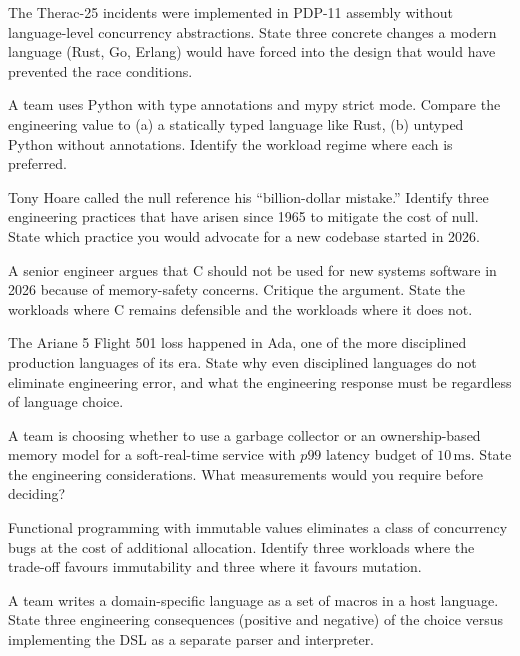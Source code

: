 \begin{exercise}
The Therac-25 incidents \cite{paper:leveson-turner1993} were implemented in PDP-11 assembly without language-level concurrency abstractions. State three concrete changes a modern language (Rust, Go, Erlang) would have forced into the design that would have prevented the race conditions.
\end{exercise}

\begin{exercise}
A team uses Python with type annotations and mypy strict mode. Compare the engineering value to (a) a statically typed language like Rust, (b) untyped Python without annotations. Identify the workload regime where each is preferred.
\end{exercise}

\begin{exercise}
Tony Hoare called the null reference his ``billion-dollar mistake.'' Identify three engineering practices that have arisen since 1965 to mitigate the cost of null. State which practice you would advocate for a new codebase started in 2026.
\end{exercise}

\begin{exercise}
A senior engineer argues that C should not be used for new systems software in 2026 because of memory-safety concerns. Critique the argument. State the workloads where C remains defensible and the workloads where it does not.
\end{exercise}

\begin{exercise}
The Ariane 5 Flight 501 loss \cite{acc:ariane501-ifr} happened in Ada, one of the more disciplined production languages of its era. State why even disciplined languages do not eliminate engineering error, and what the engineering response must be regardless of language choice.
\end{exercise}

\begin{exercise}
A team is choosing whether to use a garbage collector or an ownership-based memory model for a soft-real-time service with $p99$ latency budget of $10\,\si{\milli\second}$. State the engineering considerations. What measurements would you require before deciding?
\end{exercise}

\begin{exercise}
Functional programming with immutable values eliminates a class of concurrency bugs at the cost of additional allocation. Identify three workloads where the trade-off favours immutability and three where it favours mutation.
\end{exercise}

\begin{exercise}
A team writes a domain-specific language as a set of macros in a host language. State three engineering consequences (positive and negative) of the choice versus implementing the DSL as a separate parser and interpreter.
\end{exercise}
